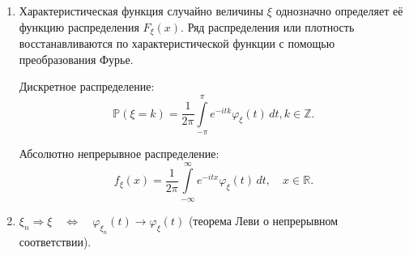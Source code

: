 \begin{namedthm}
\begin{enumerate}
        \item 
            Характеристическая функция случайно величины $\xi$ однозначно определяет её функцию распределения $F_{\xi}(x)$. 
            Ряд распределения или плотность восстанавливаются по характеристической функции с помощью преобразования Фурье.
            
            Дискретное распределение:
            \begin{equation*}
                \mathbb{P}(\xi=k)=\frac{1}{2 \pi} \int\limits_{-\pi}^{\pi} e^{-i t k} \varphi_{\xi}(t) \, d t, k \in \mathbb{Z}.
            \end{equation*}
            
            Абсолютно непрерывное распределение:
            \begin{equation*}
                f_{\xi}(x)=\frac{1}{2 \pi} \int\limits_{-\infty}^{\infty} e^{-i t x} \varphi_{\xi}(t) \, d t, \quad x \in \mathbb{R}.
            \end{equation*}
        \item 
            $\xi_n \Rightarrow \xi \quad \Leftrightarrow \quad \varphi_{\xi_{n}}(t) \to \varphi_{\xi}(t)$ (теорема Леви о непрерывном соответствии).
    \end{enumerate}
\end{namedthm}

